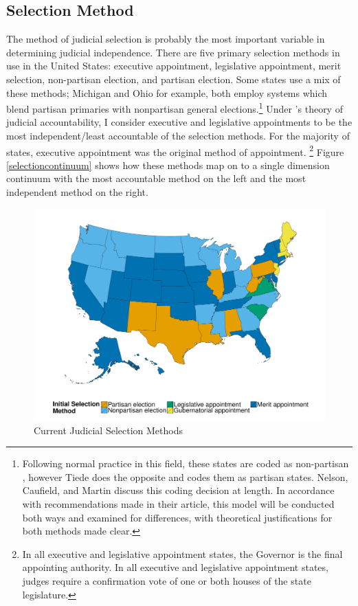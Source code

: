 \documentclass[12pt]{article}
\begin{document}
\subsection*{Selection Method}
The method of judicial selection is probably the most important variable in determining judicial independence. There are five primary selection methods in use in the United States: executive appointment, legislative appointment, merit selection, non-partisan election, and partisan election. Some states use a mix of these methods; Michigan and Ohio for example, both employ systems which blend partisan primaries with nonpartisan general elections.\footnote{Following normal practice in this field, these states are coded as non-partisan \citep{Canes-Wrone2012, Caldarone2009}, however Tiede \citeyearpar{Tiede2006} does the opposite and codes them as partisan states. Nelson, Caufield, and Martin \citeyearpar{Nelson2013} discuss this coding decision at length.  In accordance with recommendations made in their article, this model will be conducted both ways and examined for differences, with theoretical justifications for both methods made clear.}    Under \citet{Hall2007}'s theory of judicial accountability, I consider executive and legislative appointments to be the most independent/least accountable of the selection methods.  For the majority of states, executive appointment was the original method of appointment.  \footnote{In all executive and legislative appointment states, the Governor is the final appointing authority.  In all executive and legislative appointment states, judges require a confirmation vote of one or both houses of the state legislature.}  Figure \ref{selectioncontinuum} shows how these methods map on to a single dimension continuum with the most accountable method on the left and the most independent method on the right. 

\begin{figure}[tbh]\centering\caption{Current Judicial Selection Methods}\label{selectionmap}
	\includegraphics[scale=.5]{graphics/colr_select.pdf}
\end{figure}
\end{document}
